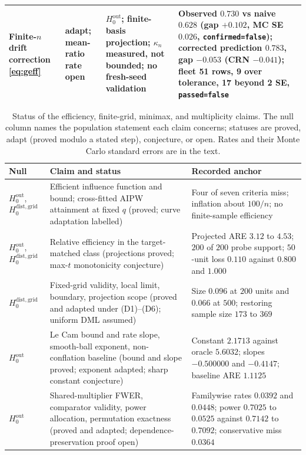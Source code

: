 \begin{table}[t]
\begin{tabular}{p{3.1cm} p{1.8cm} p{4.6cm} p{4.6cm}}
Finite-$n$ drift correction \eqref{eq:geff} & adapt; mean-ratio rate open & $H_0^{\mathrm{out}}$; finite-basis projection; $\kappa_n$ measured, not bounded; no fresh-seed validation & Observed $0.730$ vs naive $0.628$ (gap $+0.102$, MC SE $0.026$, \texttt{confirmed=false}); corrected prediction $0.783$, gap $-0.053$ (CRN $-0.041$); fleet 51 rows, 9 over tolerance, 17 beyond 2 SE, \texttt{passed=false} \\
\hline
\end{tabular}
\end{table}

\begin{table}[t]
\centering
\small
\caption{Status of the efficiency, finite-grid, minimax, and multiplicity claims. The null column names the population statement each claim concerns; statuses are proved, adapt (proved modulo a stated step), conjecture, or open. Rates and their Monte Carlo standard errors are in the text.}
\label{tab:efficiency-claim-status}
\begin{tabular}{p{2.2cm} p{6.2cm} p{6.0cm}}
\hline
Null & Claim and status & Recorded anchor \\
\hline
$H_0^{\mathrm{out}}$, $H_0^{\mathrm{dist,grid}}$ & Efficient influence function and bound; cross-fitted AIPW attainment at fixed $q$ (proved; curve adaptation labelled) & Four of seven criteria miss; inflation about $100/n$; no finite-sample efficiency \\
$H_0^{\mathrm{out}}$, $H_0^{\mathrm{dist,grid}}$ & Relative efficiency in the target-matched class (projections proved; max-$t$ monotonicity conjecture) & Projected ARE $3.12$ to $4.53$; $200$ of $200$ probe support; $50$-unit loss $0.110$ against $0.800$ and $1.000$ \\
$H_0^{\mathrm{dist,grid}}$ & Fixed-grid validity, local limit, boundary, projection scope (proved and adapted under (D1)--(D6); uniform DML assumed) & Size $0.096$ at $200$ units and $0.066$ at $500$; restoring sample size $173$ to $369$ \\
$H_0^{\mathrm{out}}$ & Le Cam bound and rate slope, smooth-ball exponent, non-conflation baseline (bound and slope proved; exponent adapted; sharp constant conjecture) & Constant $2.1713$ against oracle $5.6032$; slopes $-0.500000$ and $-0.4147$; baseline ARE $1.1125$ \\
$H_0^{\mathrm{out}}$ & Shared-multiplier FWER, comparator validity, power allocation, permutation exactness (proved and adapted; dependence-preservation proof open) & Familywise rates $0.0392$ and $0.0448$; power $0.7025$ to $0.0525$ against $0.7142$ to $0.7092$; conservative miss $0.0364$ \\
\hline
\end{tabular}
\end{table}

